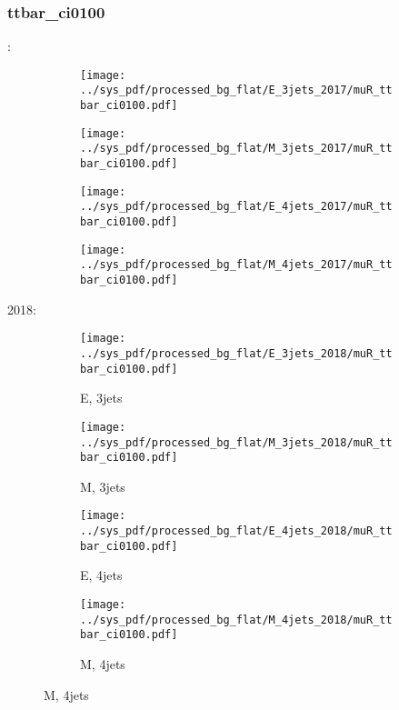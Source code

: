 \documentclass{beamer}
\begin{document}
\begin{frame}
\frametitle{ttbar_ci0100}
\fontsize{5}{1}:
\begin{figure}
\centering
\begin{subfigure}[b]{0.24\textwidth}
\texttt{[image: ../sys\_pdf/processed\_bg\_flat/E\_3jets\_2017/muR\_ttbar\_ci0100.pdf]}
\end{subfigure}
\begin{subfigure}[b]{0.24\textwidth}
\texttt{[image: ../sys\_pdf/processed\_bg\_flat/M\_3jets\_2017/muR\_ttbar\_ci0100.pdf]}
\end{subfigure}
\begin{subfigure}[b]{0.24\textwidth}
\texttt{[image: ../sys\_pdf/processed\_bg\_flat/E\_4jets\_2017/muR\_ttbar\_ci0100.pdf]}
\end{subfigure}
\begin{subfigure}[b]{0.24\textwidth}
\texttt{[image: ../sys\_pdf/processed\_bg\_flat/M\_4jets\_2017/muR\_ttbar\_ci0100.pdf]}
\end{subfigure}
\end{figure}
2018:
\begin{figure}
\centering
\begin{subfigure}[b]{0.24\textwidth}
\texttt{[image: ../sys\_pdf/processed\_bg\_flat/E\_3jets\_2018/muR\_ttbar\_ci0100.pdf]}
\captionsetup{font=tiny}
\caption{E, 3jets}
\end{subfigure}
\begin{subfigure}[b]{0.24\textwidth}
\texttt{[image: ../sys\_pdf/processed\_bg\_flat/M\_3jets\_2018/muR\_ttbar\_ci0100.pdf]}
\captionsetup{font=tiny}
\caption{M, 3jets}
\end{subfigure}
\begin{subfigure}[b]{0.24\textwidth}
\texttt{[image: ../sys\_pdf/processed\_bg\_flat/E\_4jets\_2018/muR\_ttbar\_ci0100.pdf]}
\captionsetup{font=tiny}
\caption{E, 4jets}
\end{subfigure}
\begin{subfigure}[b]{0.24\textwidth}
\texttt{[image: ../sys\_pdf/processed\_bg\_flat/M\_4jets\_2018/muR\_ttbar\_ci0100.pdf]}
\captionsetup{font=tiny}
\caption{M, 4jets}
\end{subfigure}
\end{figure}
\end{frame}
\end{document}
